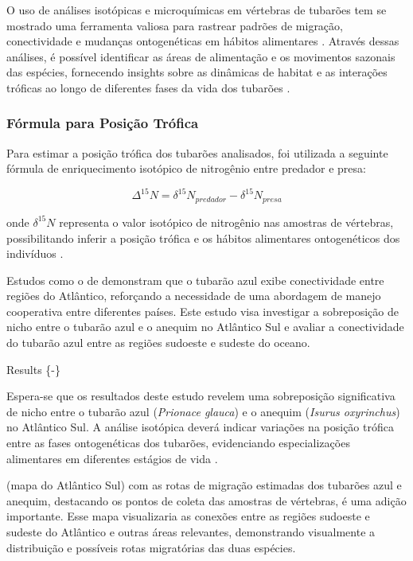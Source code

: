 \documentclass[utf8]{FrontiersinHarvard}
\begin{document}
O uso de análises isotópicas e microquímicas em vértebras de tubarões
tem se mostrado uma ferramenta valiosa para rastrear padrões de
migração, conectividade e mudanças ontogenéticas em hábitos alimentares
\citep{Estrada2006, Hussey2015}. Através dessas análises, é possível
identificar as áreas de alimentação e os movimentos sazonais das
espécies, fornecendo insights sobre as dinâmicas de habitat e as
interações tróficas ao longo de diferentes fases da vida dos tubarões
\citep{Carlisle2015, MacNeil2005}.

\subsubsection*{Fórmula para Posição
Trófica}\label{fuxf3rmula-para-posiuxe7uxe3o-truxf3fica}

Para estimar a posição trófica dos tubarões analisados, foi utilizada a
seguinte fórmula de enriquecimento isotópico de nitrogênio entre
predador e presa:

\[
\Delta^{15}N = \delta^{15}N_{predador} - \delta^{15}N_{presa}
\]

onde \(\delta^{15}N\) representa o valor isotópico de nitrogênio nas
amostras de vértebras, possibilitando inferir a posição trófica e os
hábitos alimentares ontogenéticos dos indivíduos
\citep{Shiffman2019, Rooker2008}.

Estudos como o de \citet{Queiroz2019} demonstram que o tubarão azul
exibe conectividade entre regiões do Atlântico, reforçando a necessidade
de uma abordagem de manejo cooperativa entre diferentes países. Este
estudo visa investigar a sobreposição de nicho entre o tubarão azul e o
anequim no Atlântico Sul e avaliar a conectividade do tubarão azul entre
as regiões sudoeste e sudeste do oceano.

Results \{-\}

Espera-se que os resultados deste estudo revelem uma sobreposição
significativa de nicho entre o tubarão azul (\emph{Prionace glauca}) e o
anequim (\emph{Isurus oxyrinchus}) no Atlântico Sul. A análise isotópica
deverá indicar variações na posição trófica entre as fases ontogenéticas
dos tubarões, evidenciando especializações alimentares em diferentes
estágios de vida \citep{Carlisle2015, Estrada2006}.

(mapa do Atlântico Sul) com as rotas de migração estimadas dos tubarões
azul e anequim, destacando os pontos de coleta das amostras de
vértebras, é uma adição importante. Esse mapa visualizaria as conexões
entre as regiões sudoeste e sudeste do Atlântico e outras áreas
relevantes, demonstrando visualmente a distribuição e possíveis rotas
migratórias das duas espécies.
\end{document}

